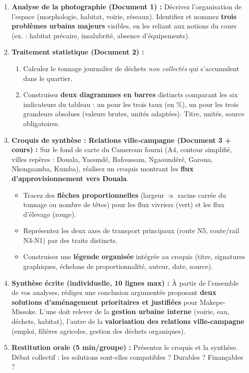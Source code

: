 \documentclass[11pt]{article}
\begin{document}
\begin{enumerate}
    \item \textbf{Analyse de la photographie (Document 1) :} Décrivez l'organisation de l'espace (morphologie, habitat, voirie, réseaux). Identifiez et nommez \textbf{trois problèmes urbains majeurs} visibles, en les reliant aux notions du cours (ex. : habitat précaire, insalubrité, absence d'équipements).
    \item \textbf{Traitement statistique (Document 2) :} 
    \begin{enumerate}
        \item Calculez le tonnage journalier de déchets \emph{non collectés} qui s'accumulent dans le quartier.
        \item Construisez \textbf{deux diagrammes en barres} distincts comparant les six indicateurs du tableau : un pour les trois taux (en \%), un pour les trois grandeurs absolues (valeurs brutes, unités adaptées). Titre, unités, source obligatoires.
    \end{enumerate}
    \item \textbf{Croquis de synthèse : Relations ville-campagne (Document 3 + cours) :} Sur le fond de carte du Cameroun fourni (A4, contour simplifié, villes repères : Douala, Yaoundé, Bafoussam, Ngaoundéré, Garoua, Nkongsamba, Kumba), réalisez un croquis montrant les \textbf{flux d'approvisionnement vers Douala}.
    \begin{itemize}
        \item Tracez des \textbf{flèches proportionnelles} (largeur $\propto$ racine carrée du tonnage ou nombre de têtes) pour les flux vivriers (vert) et les flux d'élevage (rouge).
        \item Représentez les deux axes de transport principaux (route N5, route/rail N3-N1) par des traits distincts.
        \item Construisez une \textbf{légende organisée} intégrée au croquis (titre, signatures graphiques, échelons de proportionnalité, auteur, date, source).
    \end{itemize}
    \item \textbf{Synthèse écrite (individuelle, 10 lignes max) :} À partir de l'ensemble de vos analyses, rédigez une conclusion argumentée proposant \textbf{deux solutions d'aménagement prioritaires et justifiées} pour Makepe-Missoke. L'une doit relever de la \textbf{gestion urbaine interne} (voirie, eau, déchets, habitat), l'autre de la \textbf{valorisation des relations ville-campagne} (emploi, filières agricoles, gestion des déchets organiques).
    \item \textbf{Restitution orale (5 min/groupe) :} Présentez le croquis et la synthèse. Débat collectif : les solutions sont-elles compatibles ? Durables ? Finançables ?
\end{enumerate}
\end{document}

